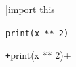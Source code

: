 \documentclass[12pt]{article}
\newcommand\"{quote}
\begin{document}
|import this|

\texttt{print(x ** 2)}

\texttt+print(x ** 2)+

\inputminted{py}{path/to/file.py}


\AnyDeclarationCommand{\eq}{\begin{equation}}
\end{document}

